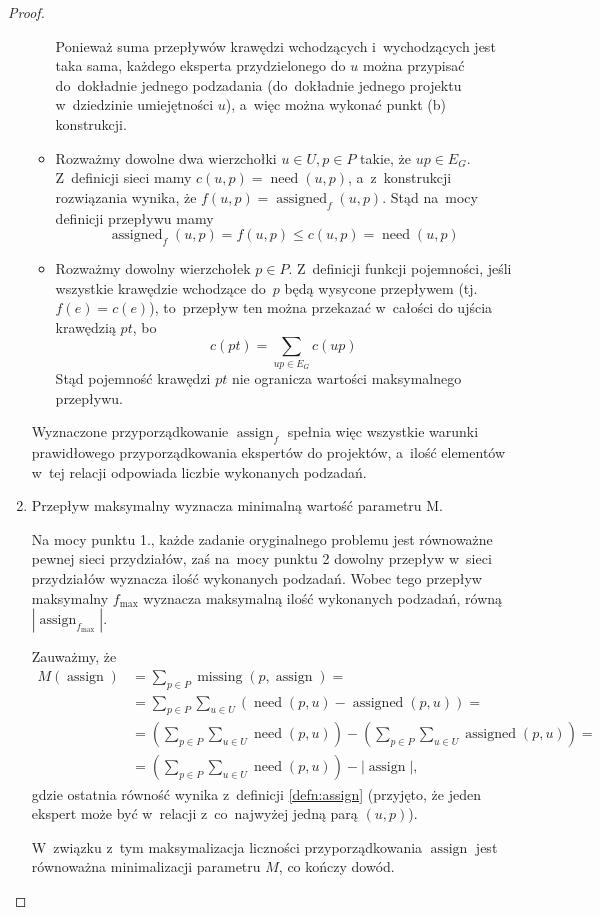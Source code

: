 \documentclass[12pt,a4paper]{article}
\theoremstyle{definition}
\DeclareMathOperator{\need}{need}
\DeclareMathOperator{\assign}{assign}
\DeclareMathOperator{\assigned}{assigned}
\DeclareMathOperator{\missing}{missing}
\begin{document}
\begin{proof}
\begin{enumerate}
\begin{itemize}
		Ponieważ suma przepływów krawędzi wchodzących i~wychodzących jest
		taka sama, każdego eksperta przydzielonego do $u$ można przypisać
		do~dokładnie jednego podzadania (do~dokładnie jednego projektu
		w~dziedzinie umiejętności $u$), a~więc można wykonać punkt (b)
		konstrukcji.
		\item Rozważmy dowolne dwa wierzchołki $u \in U, p \in P$ takie, że
		$up \in E_G$. Z~definicji sieci mamy $c(u,p) = \need(u,p)$,
		a~z~konstrukcji rozwiązania wynika, że $f(u,p) = \assigned_f(u,p)$.
		Stąd na~mocy definicji
		przepływu mamy
		$$ \assigned_f(u,p) = f(u,p) \leq c(u,p) = \need(u,p)$$
		\item Rozważmy dowolny wierzchołek $p \in P$. Z~definicji funkcji
		pojemności, jeśli wszystkie krawędzie wchodzące do~$p$ będą wysycone
		przepływem (tj. $f(e) = c(e)$), to~przepływ ten można przekazać
		w~całości do ujścia krawędzią $pt$, bo
		$$ c(pt) = \sum_{up \in E_G} c(up) $$
		Stąd pojemność krawędzi $pt$ nie ogranicza wartości maksymalnego
		przepływu.
	\end{itemize}
	Wyznaczone przyporządkowanie $\assign_f$ spełnia więc wszystkie warunki
	prawidłowego przyporządkowania ekspertów do projektów, a~ilość elementów
	w~tej relacji odpowiada liczbie wykonanych podzadań.

	\item Przepływ maksymalny wyznacza minimalną wartość parametru M.

	Na mocy punktu 1., każde zadanie oryginalnego problemu jest równoważne
	pewnej sieci przydziałów, zaś na~mocy punktu 2 dowolny przepływ w~sieci
	przydziałów wyznacza ilość wykonanych podzadań. Wobec tego przepływ
	maksymalny $f_{\max}$ wyznacza maksymalną ilość wykonanych podzadań, równą
	$\left|\assign_{f_{\max}}\right|$.

	Zauważmy, że
	\begin{align*}
	M(\assign) &= \sum_{p \in P} \missing(p, \assign) = \\
	&= \sum_{p \in P} \sum_{u \in U} (\need(p,u) - \assigned(p,u)) = \\
	&= \left( \sum_{p \in P} \sum_{u \in U} \need(p,u) \right) -
	\left( \sum_{p \in P} \sum_{u \in U} \assigned(p,u) \right) = \\
	&= \left( \sum_{p \in P} \sum_{u \in U} \need(p,u) \right) - 
	\left|\assign\right|,
	\end{align*}
	gdzie ostatnia równość wynika z~definicji \ref{defn:assign} (przyjęto,
	że jeden ekspert może być w~relacji z~co~najwyżej jedną parą $(u,p)$).
	
	W~związku z~tym maksymalizacja liczności przyporządkowania $\assign$
	jest równoważna minimalizacji parametru $M$, co kończy dowód.
\end{enumerate}
\end{proof}
\end{document}
